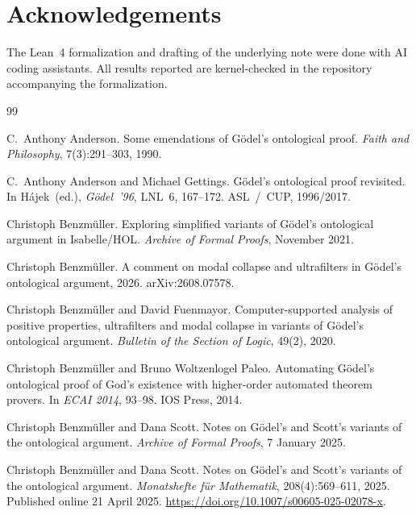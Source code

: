 \documentclass[11pt]{article}
\begin{document}
\section*{Acknowledgements}

The Lean~4 formalization and drafting of the underlying note were done with AI coding
assistants. All results reported are kernel-checked in the repository accompanying the
formalization.

\begin{thebibliography}{99}

C.~Anthony Anderson.
\newblock Some emendations of G\"odel's ontological proof.
\newblock \emph{Faith and Philosophy}, 7(3):291--303, 1990.

C.~Anthony Anderson and Michael Gettings.
\newblock G\"odel's ontological proof revisited.
\newblock In H\'ajek~(ed.), \emph{G\"odel~'96}, LNL~6, 167--172. ASL~/~CUP, 1996/2017.

Christoph Benzm\"uller.
\newblock Exploring simplified variants of G\"odel's ontological argument in Isabelle/HOL.
\newblock \emph{Archive of Formal Proofs}, November 2021.

Christoph Benzm\"uller.
\newblock A comment on modal collapse and ultrafilters in G\"odel's ontological argument,
2026.
\newblock arXiv:2608.07578.

Christoph Benzm\"uller and David Fuenmayor.
\newblock Computer-supported analysis of positive properties, ultrafilters and modal
collapse in variants of G\"odel's ontological argument.
\newblock \emph{Bulletin of the Section of Logic}, 49(2), 2020.

Christoph Benzm\"uller and Bruno Woltzenlogel Paleo.
\newblock Automating G\"odel's ontological proof of God's existence with higher-order
automated theorem provers.
\newblock In \emph{ECAI 2014}, 93--98. IOS Press, 2014.

Christoph Benzm\"uller and Dana Scott.
\newblock Notes on G\"odel's and Scott's variants of the ontological argument.
\newblock \emph{Archive of Formal Proofs}, 7 January 2025.

Christoph Benzm\"uller and Dana Scott.
\newblock Notes on G\"odel's and Scott's variants of the ontological argument.
\newblock \emph{Monatshefte f\"ur Mathematik}, 208(4):569--611, 2025.
Published online 21 April 2025. \url{https://doi.org/10.1007/s00605-025-02078-x}.


\end{thebibliography}
\end{document}
